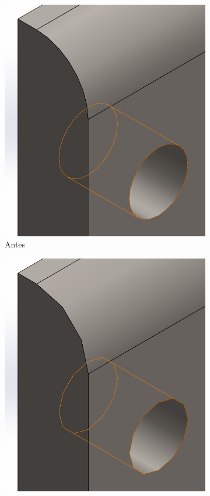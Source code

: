 \documentclass[12pt,letterpaper,final]{report}
\begin{document}
\begin{figure}[H]
	\centering
	\begin{subfigure}[b]{0.45\textwidth}
		\includegraphics[width=\textwidth]{Imagenes/solidworks_macro_15}
		\caption{Antes}
		\label{fig:solidworksmacro15}
	\end{subfigure}
	\begin{subfigure}[b]{0.45\textwidth}
		\includegraphics[width=\textwidth]{Imagenes/solidworks_macro_16}

\end{subfigure}
\end{figure}
\end{document}
